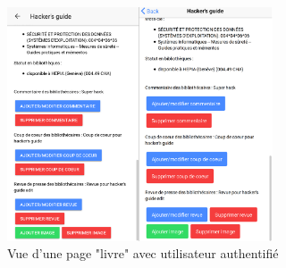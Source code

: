 \documentclass[a4paper, 12pt]{article}
\begin{document}
\begin{figure}
    \begin{center}
        \includegraphics[width=0.7\textwidth]{images/screenshots/android_iphone_7.png}
    \end{center}
    \caption{Vue d'une page "livre" avec utilisateur authentifié}
\end{figure}
\end{document}
